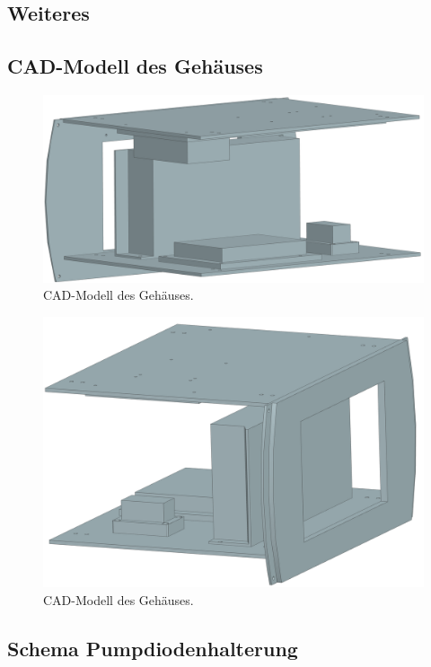\begin{appendix}
\section{Weiteres}
\subsection{CAD-Modell des Gehäuses}
\label{chptr:_cad_gehäuse}

\begin{figure}[H]
    \centering
    \includegraphics[scale=0.55]{98_images/assembly_controller_a_01.PNG}
    \caption{CAD-Modell des Gehäuses.}
    \label{fig:cad_modell_01}
\end{figure}

\begin{figure}[H]
    \centering
    \includegraphics[scale=0.55]{98_images/assembly_controller_a_02.PNG}
    \caption{CAD-Modell des Gehäuses.}
    \label{fig:cad_modell_02}
\end{figure}

\subsection{Schema Pumpdiodenhalterung}
\label{chptr:_pumpdiodenhalterung}


\end{appendix}
